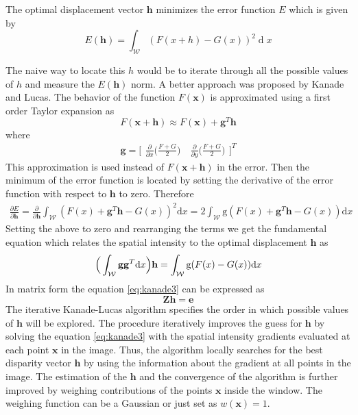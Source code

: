 \documentclass[11pt,a4paper]{report}
\begin{document}
The optimal displacement vector $\mathbf{h}$ minimizes the error function $E$ which is
given by
\begin{equation}
E(\mathbf{h}) = \int_{\mathcal{W}} (F(x + h) - G(x))^2 \mathop{d}x
\end{equation}

The naive way to locate this $h$  would be to iterate through all the possible values of $h$ and measure the $E(\mathbf{h})$ norm. A
better approach was proposed by Kanade and Lucas. The behavior
of the function $F(\mathbf{x})$ is approximated using a first order Taylor expansion as 
\begin{equation}\label{eq:kanade1}
F(\mathbf{x + h}) \approx F(\mathbf{x}) + \mathbf{g}^T\mathbf{h}
\end{equation}
where 
\begin{equation}
\mathbf{g} = \bigr[ \begin{smallmatrix} \frac{\partial}{\partial x}
    \bigr(\frac{F + G}{2}\bigl) \quad \frac{\partial}{\partial y} \bigr(\frac{F + G}{2}\bigl) \end{smallmatrix} \bigl]^T
\end{equation} 
This approximation is used instead of $F(\mathbf{x + h})$ in the error. Then the minimum of the error
function is located by setting the derivative of the error function with respect
to $\mathbf{h}$ to zero. Therefore
\begin{align}\label{eq:kanade2}
\frac{\partial E}{\partial \mathbf{h}} = \frac{\partial}{\partial \mathbf{h}}
\int_{\mathcal{W}} (F(x) + \mathbf{g}^T\mathbf{h} - G(x))^2 \mathrm{d}x =
2\int_{\mathcal{W}} \mathrm{g}(F(x) + \mathbf{g}^T\mathbf{h} - G(x))
\mathrm{d}x
\end{align}
Setting the above to zero and rearranging the terms we get the fundamental
equation which relates the spatial intensity to the optimal displacement
$\mathbf{h}$ as
\begin{align}\label{eq:kanade3}
\Bigr(\int_{\mathcal{W}} \mathbf{g}\mathbf{g}^T\mathrm{d}x\Bigl)\mathbf{h} = \int_{\mathcal{W}} \mathrm{g}(F(x) - G(x))
\mathrm{d}x
\end{align}
In matrix form the equation \ref{eq:kanade3} can be expressed as
\begin{equation}\label{eq:kanade4}
\mathbf{Z}\mathbf{h} = \mathbf{e}
\end{equation}
The iterative Kanade-Lucas algorithm specifies the order in which possible values of $\mathbf{h}$ will be explored. The procedure
iteratively improves the guess for $\mathbf{h}$ by solving the equation
\ref{eq:kanade3} with the spatial intensity
gradients evaluated at each point $\mathbf{x}$ in the image. Thus, the algorithm locally searches for the best disparity vector $\mathbf{h}$ by using the
information about the gradient at all points in the image. The estimation of the
$\mathbf{h}$ and the convergence of the algorithm is further improved by
weighing contributions of the points $\mathbf{x}$ inside the window. The
weighing function can be a Gaussian or just set as $w(\mathbf{x}) = 1$.
\end{document}
